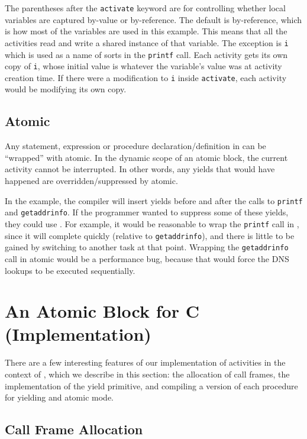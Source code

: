 \documentclass[acmsmall,anonymous,review]{acmart}\settopmatter{printfolios=true,printccs=false,printacmref=false}
\begin{document}
The parentheses after the \texttt{activate} keyword are for controlling whether local variables are captured by-value or by-reference.
The default is by-reference, which is how most of the variables are used in this example.
This means that all the activities read and write a shared instance of that variable.
The exception is \texttt{i} which is used as a name of sorts in the \texttt{printf} call.
Each activity gets its own copy of \texttt{i}, whose initial value is whatever the variable's value was at activity creation time.
If there were a modification to \texttt{i} inside \texttt{activate}, each activity would be modifying its own copy.

\subsection{Atomic}
\label{sec:atomic}

Any statement, expression or procedure declaration/definition in \charcoal{} can be ``wrapped'' with atomic.
In the dynamic scope of an atomic block, the current activity cannot be interrupted.
In other words, any yields that would have happened are overridden/suppressed by atomic.

In the example, the compiler will insert yields before and after the calls to \texttt{printf} and \texttt{getaddrinfo}.
If the programmer wanted to suppress some of these yields, they could use \atomic{}.
For example, it would be reasonable to wrap the \texttt{printf} call in \atomic{}, since it will complete quickly (relative to \texttt{getaddrinfo}), and there is little to be gained by switching to another task at that point.
Wrapping the \texttt{getaddrinfo} call in atomic would be a performance bug, because that would force the DNS lookups to be executed sequentially.

\section{An Atomic Block for C (Implementation)}

There are a few interesting features of our implementation of activities in the context of \charcoal{}, which we describe in this section: the allocation of call frames, the implementation of the yield primitive, and compiling a version of each procedure for yielding and atomic mode.

\subsection{Call Frame Allocation}
\end{document}
